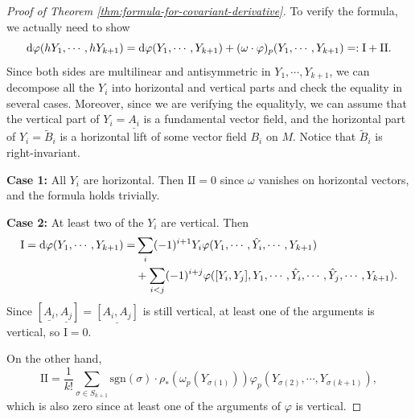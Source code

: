 \begin{proof}[Proof of Theorem \ref{thm:formula-for-covariant-derivative}]
    To verify the formula, we actually need to show
    \begin{equation*}
        {\rm d}\varphi(hY_1, \cdots, hY_{k+1}) = {\rm d}\varphi(Y_1, \cdots, Y_{k+1}) + (\omega\cdot\varphi)_p(Y_1, \cdots, Y_{k+1}) 
        =: \mathrm{I} + \mathrm{II}.
    \end{equation*}
    Since both sides are multilinear and antisymmetric in $Y_1, \cdots, Y_{k+1}$, 
    we can decompose all the $Y_i$ into horizontal and vertical parts and check the equality in several cases. 
    Moreover, since we are verifying the equalityly, we can assume that the vertical part of $Y_i=\underline{A_i}$ is a fundamental vector field, 
    and the horizontal part of $Y_i=\tilde{B}_i$ is a horizontal lift of some vector field $B_i$ on $M$. 
    Notice that $\tilde{B}_i$ is right-invariant. 
    
    \noindent\textbf{Case 1:} All $Y_i$ are horizontal. Then $\mathrm{II}=0$ since $\omega$ vanishes on horizontal vectors, 
    and the formula holds trivially.

    \noindent\textbf{Case 2:} At least two of the $Y_i$ are vertical. Then 
    \begin{align*}
        \mathrm{I} = {\rm d}\varphi(Y_1, \cdots, Y_{k+1}) 
        =& \sum_i (-1)^{i+1}Y_i\varphi(Y_1, \cdots, \hat{Y}_i, \cdots, Y_{k+1}) \\ 
        &+ \sum_{i<j} (-1)^{i+j}\varphi([Y_i, Y_j], Y_1, \cdots, \hat{Y}_i, \cdots, \hat{Y}_j, \cdots, Y_{k+1}).
    \end{align*}
    Since $[\underline{A_i}, \underline{A_j}] = \underline{[A_i, A_j]}$ is still vertical, 
    at least one of the arguments is vertical, so $\mathrm{I}=0$. 

    On the other hand, 
    \begin{equation*}
        \mathrm{II} = \frac{1}{k!}\sum_{\sigma\in S_{k+1}} \mathrm{sgn}(\sigma)\cdot \rho_*(\omega_p(Y_{\sigma(1)}))\varphi_p(Y_{\sigma(2)}, \cdots, Y_{\sigma(k+1)}),
    \end{equation*}
    which is also zero since at least one of the arguments of $\varphi$ is vertical. 


\end{proof}
